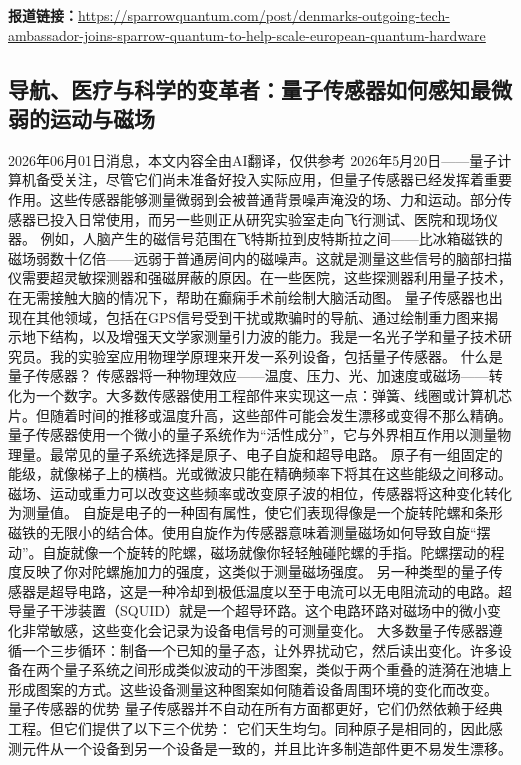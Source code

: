 \documentclass[12pt,a4paper]{ctexart}
\begin{document}
\noindent\textbf{报道链接：}\url{https://sparrowquantum.com/post/denmarks-outgoing-tech-ambassador-joins-sparrow-quantum-to-help-scale-european-quantum-hardware}

\subsection{ 导航、医疗与科学的变革者：量子传感器如何感知最微弱的运动与磁场 }

2026年06月01日消息，本文内容全由AI翻译，仅供参考
2026年5月20日——量子计算机备受关注，尽管它们尚未准备好投入实际应用，但量子传感器已经发挥着重要作用。这些传感器能够测量微弱到会被普通背景噪声淹没的场、力和运动。部分传感器已投入日常使用，而另一些则正从研究实验室走向飞行测试、医院和现场仪器。
例如，人脑产生的磁信号范围在飞特斯拉到皮特斯拉之间——比冰箱磁铁的磁场弱数十亿倍——远弱于普通房间内的磁噪声。这就是测量这些信号的脑部扫描仪需要超灵敏探测器和强磁屏蔽的原因。在一些医院，这些探测器利用量子技术，在无需接触大脑的情况下，帮助在癫痫手术前绘制大脑活动图。
量子传感器也出现在其他领域，包括在GPS信号受到干扰或欺骗时的导航、通过绘制重力图来揭示地下结构，以及增强天文学家测量引力波的能力。我是一名光子学和量子技术研究员。我的实验室应用物理学原理来开发一系列设备，包括量子传感器。
什么是量子传感器？
传感器将一种物理效应——温度、压力、光、加速度或磁场——转化为一个数字。大多数传感器使用工程部件来实现这一点：弹簧、线圈或计算机芯片。但随着时间的推移或温度升高，这些部件可能会发生漂移或变得不那么精确。
量子传感器使用一个微小的量子系统作为“活性成分”，它与外界相互作用以测量物理量。最常见的量子系统选择是原子、电子自旋和超导电路。
原子有一组固定的能级，就像梯子上的横档。光或微波只能在精确频率下将其在这些能级之间移动。磁场、运动或重力可以改变这些频率或改变原子波的相位，传感器将这种变化转化为测量值。
自旋是电子的一种固有属性，使它们表现得像是一个旋转陀螺和条形磁铁的无限小的结合体。使用自旋作为传感器意味着测量磁场如何导致自旋“摆动”。自旋就像一个旋转的陀螺，磁场就像你轻轻触碰陀螺的手指。陀螺摆动的程度反映了你对陀螺施加力的强度，这类似于测量磁场强度。
另一种类型的量子传感器是超导电路，这是一种冷却到极低温度以至于电流可以无电阻流动的电路。超导量子干涉装置（SQUID）就是一个超导环路。这个电路环路对磁场中的微小变化非常敏感，这些变化会记录为设备电信号的可测量变化。
大多数量子传感器遵循一个三步循环：制备一个已知的量子态，让外界扰动它，然后读出变化。许多设备在两个量子系统之间形成类似波动的干涉图案，类似于两个重叠的涟漪在池塘上形成图案的方式。这些设备测量这种图案如何随着设备周围环境的变化而改变。
量子传感器的优势
量子传感器并不自动在所有方面都更好，它们仍然依赖于经典工程。但它们提供了以下三个优势：
它们天生均匀。同种原子是相同的，因此感测元件从一个设备到另一个设备是一致的，并且比许多制造部件更不易发生漂移。
\end{document}
